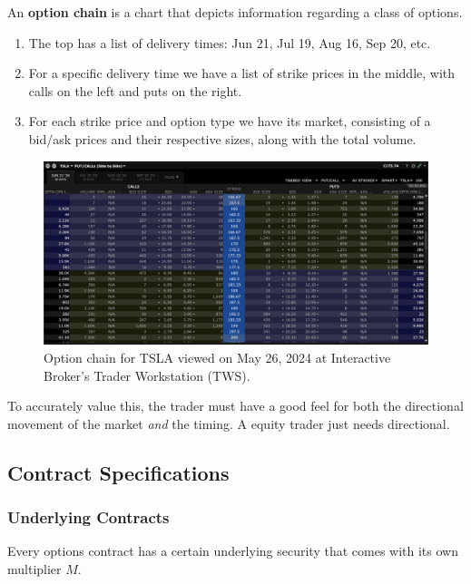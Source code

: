 \documentclass{article}
\begin{document}
    \begin{example}
      An \textbf{option chain} is a chart that depicts information regarding a class of options. 
      \begin{enumerate}
        \item The top has a list of delivery times: Jun 21, Jul 19, Aug 16, Sep 20, etc. 
        \item For a specific delivery time we have a list of strike prices in the middle, with calls on the left and puts on the right. 
        \item For each strike price and option type we have its market, consisting of a bid/ask prices and their respective sizes, along with the total volume. 
      \end{enumerate}
      \begin{figure}[H]
        \centering 
        \includegraphics[scale=0.28]{img/option_chain.png}
        \caption{Option chain for TSLA viewed on May 26, 2024 at Interactive Broker's Trader Workstation (TWS). } 
        \label{fig:option_chain}
      \end{figure}
    \end{example}

    To accurately value this, the trader must have a good feel for both the directional movement of the market \textit{and} the timing. A equity trader just needs directional. 

  \subsection{Contract Specifications}

    \subsubsection{Underlying Contracts}
      
      Every options contract has a certain underlying security that comes with its own multiplier $M$. 
\end{document}
